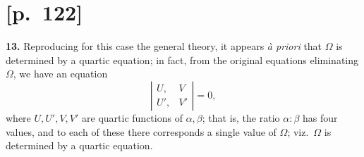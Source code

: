 \documentclass[11pt]{article}
\begin{document}
\section*{[p.~122]}

\textbf{13.} Reproducing for this case the general theory, it appears \emph{\`a
priori} that $\Omega$ is determined by a quartic equation; in fact, from
the original equations eliminating $\Omega$, we have an equation
\[
\left|\begin{array}{cc} U, & V \\ U', & V' \end{array}\right| = 0,
\]
where $U, U', V, V'$ are quartic functions of $\alpha, \beta$; that is, the
ratio $\alpha:\beta$ has four values, and to each of these there corresponds
a single value of $\Omega$; viz.\ $\Omega$ is determined by a quartic equation.
\end{document}
